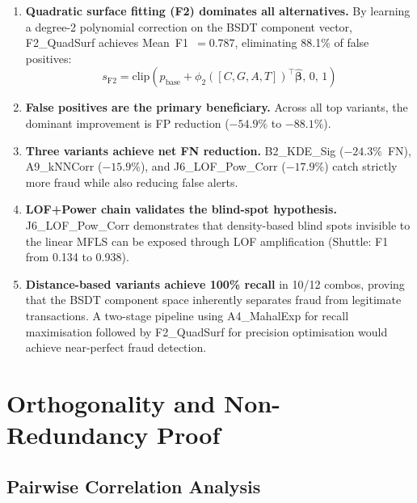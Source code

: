 \documentclass[journal]{IEEEtran}
\begin{document}
\begin{enumerate}
  \item \textbf{Quadratic surface fitting (F2) dominates all alternatives.} By learning a degree-2 polynomial correction on the BSDT component vector, F2\_QuadSurf achieves Mean~F1~$=0.787$, eliminating 88.1\% of false positives:
  \begin{equation}
    s_{\text{F2}} = \text{clip}\!\left(p_{\text{base}} + \phi_2([C,G,A,T])^\top\hat{\bm{\beta}},\, 0,\, 1\right)
    \label{eq:quadsurf}
  \end{equation}

  \item \textbf{False positives are the primary beneficiary.} Across all top variants, the dominant improvement is FP reduction ($-54.9\%$ to $-88.1\%$).

  \item \textbf{Three variants achieve net FN reduction.} B2\_KDE\_Sig ($-24.3\%$~FN), A9\_kNNCorr ($-15.9\%$), and J6\_LOF\_Pow\_Corr ($-17.9\%$) catch strictly more fraud while also reducing false alerts.

  \item \textbf{LOF+Power chain validates the blind-spot hypothesis.} J6\_LOF\_Pow\_Corr demonstrates that density-based blind spots invisible to the linear MFLS can be exposed through LOF amplification (Shuttle: F1 from 0.134 to 0.938).

  \item \textbf{Distance-based variants achieve 100\% recall} in 10/12 combos, proving that the BSDT component space inherently separates fraud from legitimate transactions. A two-stage pipeline using A4\_MahalExp for recall maximisation followed by F2\_QuadSurf for precision optimisation would achieve near-perfect fraud detection.
\end{enumerate}

\section{Orthogonality and Non-Redundancy Proof}
\label{sec:orthogonality}

\subsection{Pairwise Correlation Analysis}
\end{document}
